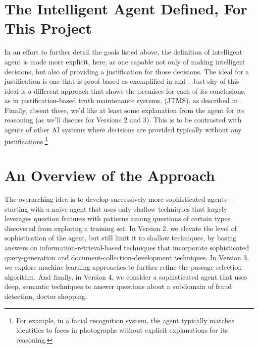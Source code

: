 \section{The Intelligent Agent Defined, For This Project}
In an effort to further detail the goals listed above, the definition of intelligent agent is made more explicit, here, as one capable not only of making intelligent decisions, but also of providing a justification for those decisions.  The ideal for a justification is one that is proof-based as exemplified in \cite{bringsjord2015logicist} and \cite{johnson2014three}.  Just shy of this ideal is a different approach that shows the premises for each of its conclusions, as in justification-based truth maintenance systems, (JTMS), as described in \cite{russell_norvig_2010_sect12.6}. Finally, absent these, we'd like at least some explanation from the agent for its reasoning (as we'll discuss for Versions 2 and 3).  This is to be contrasted with agents of other AI systems where decisions are provided typically without any justifications.\footnote{For example, in a facial recognition system, the agent typically matches identities to faces in photographs without explicit explanations for its reasoning.} 


%

\section{An Overview of the Approach}

The overarching idea is to develop successively more sophisticated agents -- starting with a naive agent that uses only shallow techniques that largely leverages question features with patterns among questions of certain types discovered from exploring a training set.  In Version 2, we elevate the level of sophistication of the agent, but still limit it to shallow techniques, by basing answers on information-retrieval-based techniques that incorporate sophisticated query-generation and document-collection-development techniques.  In Version 3, we explore machine learning approaches to further refine the passage selection algorithm.  And finally, in Version 4, we consider a sophisticated agent that uses deep, semantic techniques to answer questions about a subdomain of fraud detection, doctor shopping.

